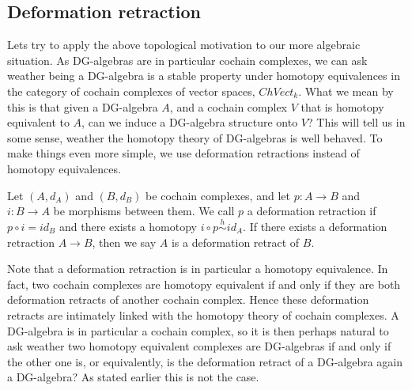

\subsection{Deformation retraction}



Lets try to apply the above topological motivation to our more algebraic situation. As DG-algebras are in particular cochain complexes, we can ask weather being a DG-algebra is a stable property under homotopy equivalences in the category of cochain complexes of vector spaces, $ChVect_k$. What we mean by this is that given a DG-algebra $A$, and a cochain complex $V$ that is homotopy equivalent to $A$, can we induce a DG-algebra structure onto $V$? This will tell us in some sense, weather the homotopy theory of DG-algebras is well behaved. To make things even more simple, we use deformation retractions instead of homotopy equivalences. 

\begin{definition}
Let $(A, d_A)$ and $(B, d_B)$ be cochain complexes, and let $p:A\longrightarrow B$ and $i:B\longrightarrow A$ be morphisms between them. We call $p$ a deformation retraction if $p\circ i = id_B$ and there exists a homotopy $i\circ p\overset{h}\sim id_A$. If there exists a deformation retraction $A\longrightarrow B$, then we say $A$ is a deformation retract of $B$. 
\end{definition}

Note that a deformation retraction is in particular a homotopy equivalence. In fact, two cochain complexes are homotopy equivalent if and only if they are both deformation retracts of another cochain complex. Hence these deformation retracts are intimately linked with the homotopy theory of cochain complexes. A DG-algebra is in particular a cochain complex, so it is then perhaps natural to ask weather two homotopy equivalent complexes are DG-algebras if and only if the other one is, or equivalently, is the deformation retract of a DG-algebra again a DG-algebra? As stated earlier this is not the case. 

